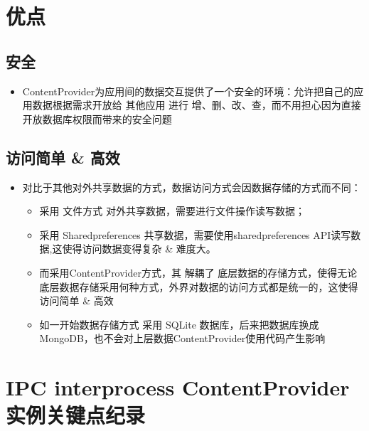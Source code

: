 \documentclass[9pt, b5paaper]{book}
\begin{document}
\section{优点}
\label{sec-5-8}
\subsection{安全}
\label{sec-5-8-1}
\begin{itemize}
\item ContentProvider为应用间的数据交互提供了一个安全的环境：允许把自己的应用数据根据需求开放给 其他应用 进行 增、删、改、查，而不用担心因为直接开放数据库权限而带来的安全问题
\end{itemize}
\subsection{访问简单 \& 高效}
\label{sec-5-8-2}
\begin{itemize}
\item 对比于其他对外共享数据的方式，数据访问方式会因数据存储的方式而不同：
\begin{itemize}
\item 采用 文件方式 对外共享数据，需要进行文件操作读写数据；
\item 采用 Sharedpreferences 共享数据，需要使用sharedpreferences API读写数据,这使得访问数据变得复杂 \& 难度大。
\item 而采用ContentProvider方式，其 解耦了 底层数据的存储方式，使得无论底层数据存储采用何种方式，外界对数据的访问方式都是统一的，这使得访问简单 \& 高效
\item 如一开始数据存储方式 采用 SQLite 数据库，后来把数据库换成 MongoDB，也不会对上层数据ContentProvider使用代码产生影响
\end{itemize}
\end{itemize}
\section{IPC interprocess ContentProvider 实例关键点纪录}
\label{sec-5-9}
\end{document}
